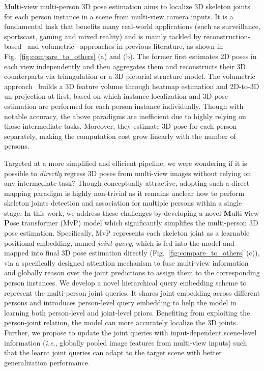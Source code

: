 \documentclass{article}
\newcommand{\ie}{\emph{i.e.}}
\begin{document}
Multi-view multi-person 3D pose estimation aims to localize 3D skeleton joints for each person instance in a scene from multi-view camera inputs. 
It is a fundamental task that benefits many real-world applications (such as surveillance, sportscast, gaming and mixed reality) and 
is mainly tackled by reconstruction-based~\cite{dong2019fast,huang2020end,chen2020multi} and volumetric~\cite{Tu2020} approaches in previous literature, as shown in Fig.~\ref{fig:compare_to_others} (a) and (b).
The former first estimates 2D poses in each view independently and then aggregates them and reconstructs their 3D counterparts via triangulation or a 3D pictorial structure model.
The volumetric approach~\cite{Tu2020} builds a 3D feature volume through heatmap estimation and 2D-to-3D un-projection at first, based on which instance localization and 3D pose estimation are performed for each person instance individually.
Though with notable accuracy, the above paradigms are inefficient due to highly relying on those intermediate tasks.
Moreover, they estimate 3D pose for each person separately, making the computation cost grow linearly with the number of persons. 

Targeted at a more simplified and efficient pipeline, we were wondering if it is possible to \textit{directly} regress 3D poses from multi-view images  without relying on any intermediate task? 
Though conceptually attractive, adopting such a direct mapping paradigm is highly non-trivial as it remains unclear how to perform skeleton joints detection and association for multiple persons within a single stage.
{In this work, we address these challenges by developing a novel \textbf{M}ulti-\textbf{v}iew \textbf{P}ose transformer (MvP) model which significantly  simplifies the multi-person 3D pose estimation.}
Specifically, MvP represents each skeleton joint as a learnable positional embedding, named \textit{joint query}, which is fed into the model and mapped into final 3D pose estimation directly (Fig.~\ref{fig:compare_to_others} (c)),  via a specifically designed attention mechanism to  fuse multi-view information 
and globally reason over the joint predictions to assign them to the corresponding person instances.  
We develop a  novel hierarchical query embedding scheme to represent the multi-person joint queries. It shares joint  embedding across different persons and introduces person-level query embedding to 
help the model in learning both   person-level and joint-level priors. Benefiting from  exploiting the person-joint relation,   the model can more accurately localize  the 3D joints. 
Further, we propose to update the joint queries with input-dependent scene-level information (\ie, globally pooled image features from multi-view inputs) such that the learnt joint queries can adapt to the target scene with better generalization performance. 
\end{document}
